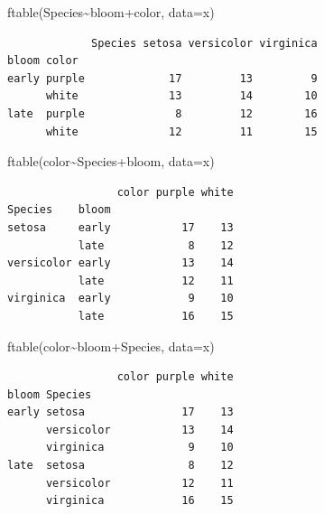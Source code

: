 \documentclass[
  13,
  letterpaper,
]{report}
\newenvironment{Shaded}{\begin{snugshade}}{\end{snugshade}}
\newcommand{\AttributeTok}[1]{\textcolor[rgb]{0.40,0.45,0.13}{#1}}
\newcommand{\FunctionTok}[1]{\textcolor[rgb]{0.28,0.35,0.67}{#1}}
\newcommand{\NormalTok}[1]{\textcolor[rgb]{0.00,0.23,0.31}{#1}}
\newcommand{\SpecialCharTok}[1]{\textcolor[rgb]{0.37,0.37,0.37}{#1}}
\begin{document}
\begin{Shaded}
\begin{Highlighting}[]
\FunctionTok{ftable}\NormalTok{(Species}\SpecialCharTok{\textasciitilde{}}\NormalTok{bloom}\SpecialCharTok{+}\NormalTok{color, }\AttributeTok{data=}\NormalTok{x)}
\end{Highlighting}
\end{Shaded}

\begin{verbatim}
             Species setosa versicolor virginica
bloom color                                     
early purple             17         13         9
      white              13         14        10
late  purple              8         12        16
      white              12         11        15
\end{verbatim}

\begin{Shaded}
\begin{Highlighting}[]
\FunctionTok{ftable}\NormalTok{(color}\SpecialCharTok{\textasciitilde{}}\NormalTok{Species}\SpecialCharTok{+}\NormalTok{bloom, }\AttributeTok{data=}\NormalTok{x)}
\end{Highlighting}
\end{Shaded}

\begin{verbatim}
                 color purple white
Species    bloom                   
setosa     early           17    13
           late             8    12
versicolor early           13    14
           late            12    11
virginica  early            9    10
           late            16    15
\end{verbatim}

\begin{Shaded}
\begin{Highlighting}[]
\FunctionTok{ftable}\NormalTok{(color}\SpecialCharTok{\textasciitilde{}}\NormalTok{bloom}\SpecialCharTok{+}\NormalTok{Species, }\AttributeTok{data=}\NormalTok{x)}
\end{Highlighting}
\end{Shaded}

\begin{verbatim}
                 color purple white
bloom Species                      
early setosa               17    13
      versicolor           13    14
      virginica             9    10
late  setosa                8    12
      versicolor           12    11
      virginica            16    15
\end{verbatim}
\end{document}
